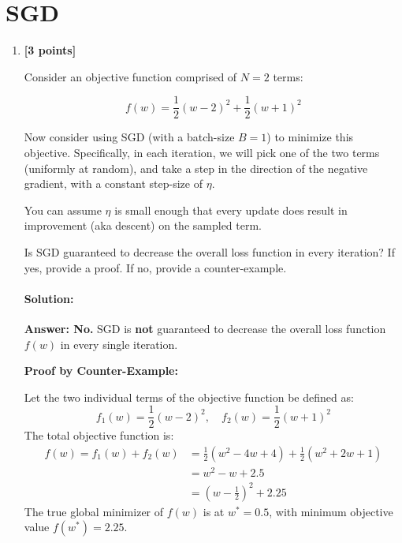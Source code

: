 \documentclass[11pt,english]{article}
\begin{document}
\newpage

\section{SGD}
\begin{enumerate}[resume]

\item 
\textbf{[3 points]}

Consider an objective function comprised of $N=2$ terms:

\begin{equation}
f(w) = \frac{1}{2} (w-2)^2 + \frac{1}{2}(w+1)^2
\end{equation}

Now consider using SGD (with a batch-size $B=1$) to minimize this objective. Specifically, in each iteration,
we will pick one of the two terms (uniformly at random), and take a step in the direction of the negative gradient, with a constant
step-size of $\eta$.

You can assume $\eta$ is small enough that every update does result in improvement (aka descent) on the sampled term.

Is SGD guaranteed to decrease the overall loss function in every iteration? If yes, provide a proof. If no, provide a counter-example.

\paragraph{Solution:}

\textbf{Answer: No.} SGD is \textbf{not} guaranteed to decrease the overall loss function $f(w)$ in every single iteration.

\vspace{0.5em}
\textbf{Proof by Counter-Example:}

Let the two individual terms of the objective function be defined as:
\begin{equation}
    f_1(w) = \frac{1}{2}(w-2)^2, \quad f_2(w) = \frac{1}{2}(w+1)^2
\end{equation}
The total objective function is:
\begin{align}
    f(w) = f_1(w) + f_2(w) &= \frac{1}{2}(w^2 - 4w + 4) + \frac{1}{2}(w^2 + 2w + 1) \\
    &= w^2 - w + 2.5 \\
    &= \left(w - \frac{1}{2}\right)^2 + 2.25
\end{align}
The true global minimizer of $f(w)$ is at $w^* = 0.5$, with minimum objective value $f(w^*) = 2.25$.


\end{enumerate}
\end{document}
